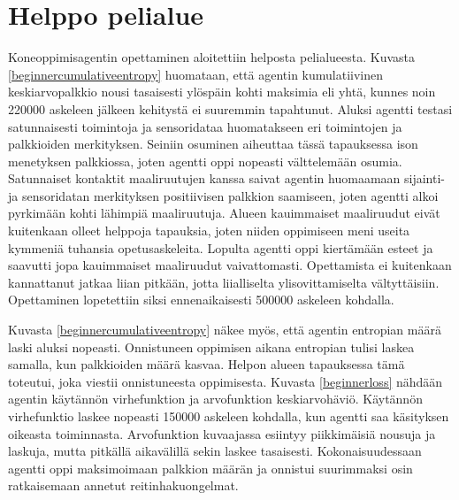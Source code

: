 \documentclass[utf8]{gradu3}
\begin{document}
\section{Helppo pelialue}
\label{helppo}

Koneoppimisagentin opettaminen aloitettiin helposta pelialueesta. Kuvasta \ref{beginnercumulativeentropy} huomataan, että agentin kumulatiivinen keskiarvopalkkio nousi tasaisesti ylöspäin kohti maksimia eli yhtä, kunnes noin 220000 askeleen jälkeen kehitystä ei suuremmin tapahtunut. Aluksi agentti testasi satunnaisesti toimintoja ja sensoridataa huomatakseen eri toimintojen ja palkkioiden merkityksen. Seiniin osuminen aiheuttaa tässä tapauksessa ison menetyksen palkkiossa, joten agentti oppi nopeasti välttelemään osumia. Satunnaiset kontaktit maaliruutujen kanssa saivat agentin huomaamaan sijainti- ja sensoridatan merkityksen positiivisen palkkion saamiseen, joten agentti alkoi pyrkimään kohti lähimpiä maaliruutuja. Alueen kauimmaiset maaliruudut eivät kuitenkaan olleet helppoja tapauksia, joten niiden oppimiseen meni useita kymmeniä tuhansia opetusaskeleita. Lopulta agentti oppi kiertämään esteet ja saavutti jopa kauimmaiset maaliruudut vaivattomasti. Opettamista ei kuitenkaan kannattanut jatkaa liian pitkään, jotta liialliselta ylisovittamiselta vältyttäisiin. Opettaminen lopetettiin siksi ennenaikaisesti 500000 askeleen kohdalla.

Kuvasta \ref{beginnercumulativeentropy} näkee myös, että agentin entropian määrä laski aluksi nopeasti. Onnistuneen oppimisen aikana entropian tulisi laskea samalla, kun palkkioiden määrä kasvaa. Helpon alueen tapauksessa tämä toteutui, joka viestii onnistuneesta oppimisesta. Kuvasta \ref{beginnerloss} nähdään agentin käytännön virhefunktion ja arvofunktion keskiarvohäviö. Käytännön virhefunktio laskee nopeasti 150000 askeleen kohdalla, kun agentti saa käsityksen oikeasta toiminnasta. Arvofunktion kuvaajassa esiintyy piikkimäisiä nousuja ja laskuja, mutta pitkällä aikavälillä sekin laskee tasaisesti. Kokonaisuudessaan agentti oppi maksimoimaan palkkion määrän ja onnistui suurimmaksi osin ratkaisemaan annetut reitinhakuongelmat.
\end{document}
